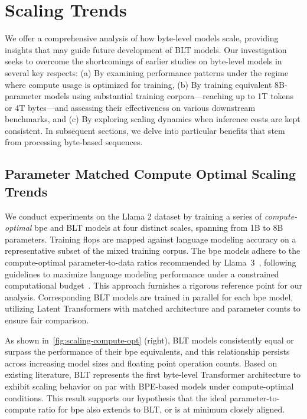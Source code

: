 \section{Scaling Trends}
\label{section:scaling}

We offer a comprehensive analysis of how byte-level models scale, providing insights that may guide future development of {\textsc BLT} models. Our investigation seeks to overcome the shortcomings of earlier studies on byte-level models in several key respects: (a) By examining performance patterns under the regime where compute usage is optimized for training, (b) By training equivalent 8B-parameter models using substantial training corpora—reaching up to 1T tokens or 4T bytes—and assessing their effectiveness on various downstream benchmarks, and (c) By exploring scaling dynamics when inference costs are kept consistent. In subsequent sections, we delve into particular benefits that stem from processing byte-based sequences.

\subsection{Parameter Matched Compute Optimal Scaling Trends}
\label{section:parameter-matched-scaling}
We conduct experiments on the Llama 2 dataset by training a series of \textit{compute-optimal} bpe and {\textsc BLT} models at four distinct scales, spanning from 1B to 8B parameters. Training flops are mapped against language modeling accuracy on a representative subset of the mixed training corpus. The bpe models adhere to the compute-optimal parameter-to-data ratios recommended by Llama~3~\citep{dubey2024llama}, following guidelines to maximize language modeling performance under a constrained computational budget~\citep{hoffmann2022training}. This approach furnishes a rigorous reference point for our analysis. Corresponding {\textsc BLT} models are trained in parallel for each bpe model, utilizing Latent Transformers with matched architecture and parameter counts to ensure fair comparison.

As shown in~\autoref{fig:scaling-compute-opt} (right), {\textsc BLT} models consistently equal or surpass the performance of their bpe equivalents, and this relationship persists across increasing model sizes and floating point operation counts. Based on existing literature, {\textsc BLT} represents the first byte-level Transformer architecture to exhibit scaling behavior on par with BPE-based models under compute-optimal conditions. This result supports our hypothesis that the ideal parameter-to-compute ratio for bpe also extends to {\textsc BLT}, or is at minimum closely aligned.

